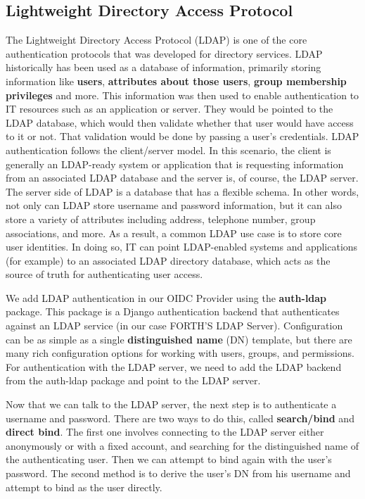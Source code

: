 \subsection{Lightweight Directory Access Protocol}

The Lightweight Directory Access Protocol (LDAP) is one of the core authentication protocols that was developed for directory services. LDAP historically has been used as a database of information, primarily storing information like \textbf{users}, \textbf{attributes about those users}, \textbf{group membership privileges} and more. This information was then used to enable authentication to IT resources such as an application or server. They would be pointed to the LDAP database, which would then validate whether that user would have access to it or not. That validation would be done by passing a user’s credentials. LDAP authentication follows the client/server model. In this scenario, the client is generally an LDAP-ready system or application that is requesting information from an associated LDAP database and the server is, of course, the LDAP server. The server side of LDAP is a database that has a flexible schema. In other words, not only can LDAP store username and password information, but it can also store a variety of attributes including address, telephone number, group associations, and more. As a result, a common LDAP use case is to store core user identities. In doing so, IT can point LDAP-enabled systems and applications (for example) to an associated LDAP directory database, which acts as the source of truth for authenticating user access.

We add LDAP authentication in our OIDC Provider using the \textbf{auth-ldap} \cite{ldapauth} package. This package is a Django authentication backend that authenticates against an LDAP service (in our case FORTH'S LDAP Server). Configuration can be as simple as a single \textbf{distinguished name} (DN) template, but there are many rich configuration options for working with users, groups, and permissions. For authentication with the LDAP server, we need to add the LDAP backend from the auth-ldap package and point to the LDAP server.

Now that we can talk to the LDAP server, the next step is to authenticate a username and password. There are two ways to do this, called \textbf{search/bind} and \textbf{direct bind}. The first one involves connecting to the LDAP server either anonymously or with a fixed account, and searching for the distinguished name of the authenticating user. Then we can attempt to bind again with the user’s password. The second method is to derive the user’s DN from his username and attempt to bind as the user directly.

